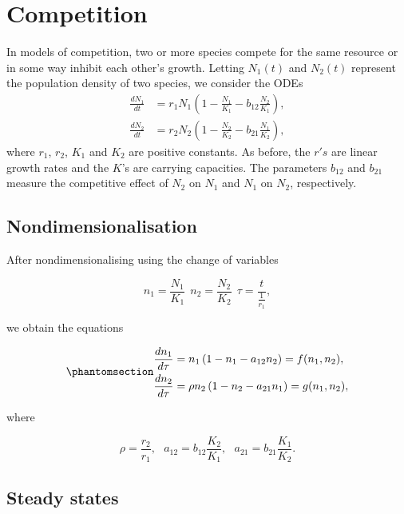 \documentclass[
  letterpaper,
  DIV=11,
  numbers=noendperiod]{scrreprt}
\begin{document}
\section{Competition}\label{competition}

In models of competition, two or more species compete for the same
resource or in some way inhibit each other's growth. Letting \(N_1(t)\)
and \(N_2(t)\) represent the population density of two species, we
consider the ODEs \[
\begin{aligned}
\frac{d N_1}{dt} &= r_1N_1\left(1-\frac{N_1}{K_1}-b_{12}\frac{N_2}{K_1}\right), \nonumber \\
\frac{d N_2}{dt} &= r_2N_2\left(1-\frac{N_2}{K_2}-b_{21}\frac{N_1}{K_2}\right), 
\end{aligned}
\] where \(r_1\), \(r_2\), \(K_1\) and \(K_2\) are positive constants.
As before, the \(r's\) are linear growth rates and the \(K\)'s are
carrying capacities. The parameters \(b_{12}\) and \(b_{21}\) measure
the competitive effect of \(N_2\) on \(N_1\) and \(N_1\) on \(N_2\),
respectively.

\subsection{Nondimensionalisation}\label{nondimensionalisation-4}

After nondimensionalising using the change of variables

\[
n_1=\frac{N_1}{K_1} \ \ n_2=\frac{N_2}{K_2} \ \ \tau=\frac{t}{\frac{1}{r_1}},
\]

we obtain the equations

\begin{equation}\protect\phantomsection\label{eq-competitionnondim}{
\begin{aligned}
\frac{d n_1}{d\tau} &= n_1\left(1- n_1-a_{12}n_2\right) = f(n_1,n_2), \nonumber \\
\frac{d n_2}{d\tau} &= \rho n_2\left(1-n_2-a_{21}n_1\right) =g(n_1,n_2),
\end{aligned}
}\end{equation}

where

\[
\rho=\frac{r_2}{r_1}, \ \ \ a_{12}=b_{12}\frac{K_2}{K_1}, \ \ \  a_{21}=b_{21}\frac{K_1}{K_2}. 
\]

\subsection{Steady states}\label{steady-states-2}
\end{document}
